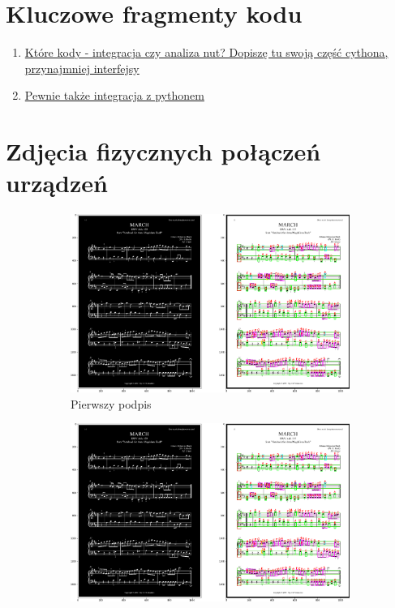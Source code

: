 \documentclass[12pt]{article}
\begin{document}
	\section{Kluczowe fragmenty kodu}
	\begin{enumerate}
		\item \underline{Które kody - integracja czy analiza nut? Dopiszę tu swoją część cythona, przynajmniej interfejsy}
		\item \underline{Pewnie także integracja z pythonem}
	\end{enumerate}

	\clearpage
	\section{Zdjęcia fizycznych połączeń urządzeń}
	\begin{figure}[h!]
		\centering
		\begin{subfigure}[b]{0.32\linewidth}
			\includegraphics[width=\linewidth]{zdjs/Zdj0.png}
			\caption{Pierwszy podpis}
		\end{subfigure}
		\begin{subfigure}[b]{0.32\linewidth}
			\includegraphics[width=\linewidth]{zdjs/Zdj0.png}

\end{subfigure}
\end{figure}
\end{document}
